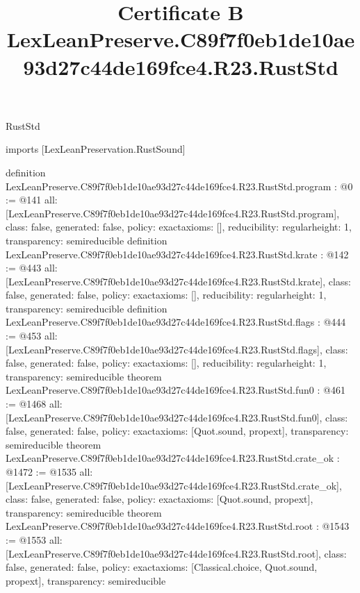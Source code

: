 \begin{lexlean}{RustStd}
\title{Certificate B LexLeanPreserve.C89f7f0eb1de10ae93d27c44de169fce4.R23.RustStd}
\begin{coremodule}
imports [LexLeanPreservation.RustSound]

definition LexLeanPreserve.C89f7f0eb1de10ae93d27c44de169fce4.R23.RustStd.program : @0 := @141 {
  all: [LexLeanPreserve.C89f7f0eb1de10ae93d27c44de169fce4.R23.RustStd.program],
  class: false,
  generated: false,
  policy: exact{axioms: []},
  reducibility: regular{height: 1},
  transparency: semireducible
}
definition LexLeanPreserve.C89f7f0eb1de10ae93d27c44de169fce4.R23.RustStd.krate : @142 := @443 {
  all: [LexLeanPreserve.C89f7f0eb1de10ae93d27c44de169fce4.R23.RustStd.krate],
  class: false,
  generated: false,
  policy: exact{axioms: []},
  reducibility: regular{height: 1},
  transparency: semireducible
}
definition LexLeanPreserve.C89f7f0eb1de10ae93d27c44de169fce4.R23.RustStd.flags : @444 := @453 {
  all: [LexLeanPreserve.C89f7f0eb1de10ae93d27c44de169fce4.R23.RustStd.flags],
  class: false,
  generated: false,
  policy: exact{axioms: []},
  reducibility: regular{height: 1},
  transparency: semireducible
}
theorem LexLeanPreserve.C89f7f0eb1de10ae93d27c44de169fce4.R23.RustStd.fun0 : @461 := @1468 {
  all: [LexLeanPreserve.C89f7f0eb1de10ae93d27c44de169fce4.R23.RustStd.fun0],
  class: false,
  generated: false,
  policy: exact{axioms: [Quot.sound, propext]},
  transparency: semireducible
}
theorem LexLeanPreserve.C89f7f0eb1de10ae93d27c44de169fce4.R23.RustStd.crate_ok : @1472 := @1535 {
  all: [LexLeanPreserve.C89f7f0eb1de10ae93d27c44de169fce4.R23.RustStd.crate_ok],
  class: false,
  generated: false,
  policy: exact{axioms: [Quot.sound, propext]},
  transparency: semireducible
}
theorem LexLeanPreserve.C89f7f0eb1de10ae93d27c44de169fce4.R23.RustStd.root : @1543 := @1553 {
  all: [LexLeanPreserve.C89f7f0eb1de10ae93d27c44de169fce4.R23.RustStd.root],
  class: false,
  generated: false,
  policy: exact{axioms: [Classical.choice, Quot.sound, propext]},
  transparency: semireducible
}


\end{coremodule}
\end{lexlean}
